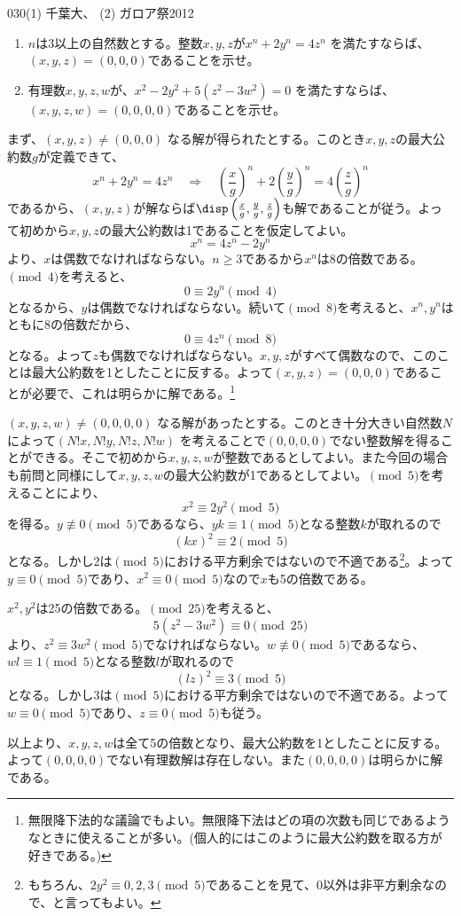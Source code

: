 \begin{thm}{030}{}{(1) 千葉大、 (2) ガロア祭2012}
 \begin{enumerate}
  \item $n$は3以上の自然数とする。整数$x,y,z$が$x^n+2y^n=4z^n$ を満たすならば、$(x,y,z)=(0,0,0)$であることを示せ。
  \item 有理数$x,y,z,w$が、$x^2-2y^2+5(z^2-3w^2)=0$ を満たすならば、$(x,y,z,w)=(0,0,0,0)$であることを示せ。
 \end{enumerate}
\end{thm}

まず、$(x, y, z)\neq (0,0,0)$ なる解が得られたとする。このとき$x,y,z$の最大公約数$g$が定義できて、
\[ x^n+2y^n=4z^n \quad\Rightarrow\quad \left(\frac{x}{g}\right)^n+2\left(\frac{y}{g}\right)^n=4\left(\frac{z}{g}\right)^n \]
であるから、$(x,y,z)$が解ならば$\disp\left(\frac{x}{g},\frac{y}{g},\frac{z}{g}\right)$も解であることが従う。よって初めから$x,y,z$の最大公約数は1であることを仮定してよい。
\[ x^n=4z^n-2y^n \]
より、$x$は偶数でなければならない。$n\ge 3$であるから$x^n$は8の倍数である。$\pmod{4}$を考えると、
\[ 0\equiv 2y^n \pmod{4} \]
となるから、$y$は偶数でなければならない。続いて$\pmod{8}$を考えると、$x^n, y^n$はともに8の倍数だから、
\[ 0\equiv 4z^n \pmod{8} \]
となる。よって$z$も偶数でなければならない。$x,y,z$がすべて偶数なので、このことは最大公約数を1としたことに反する。よって$(x,y,z)=(0,0,0)$であることが必要で、これは明らかに解である。\footnote{無限降下法的な議論でもよい。無限降下法はどの項の次数も同じであるようなときに使えることが多い。(個人的にはこのように最大公約数を取る方が好きである。)}

$(x,y,z,w)\neq(0,0,0,0)$ なる解があったとする。このとき十分大きい自然数$N$によって$(N!x,N!y,N!z,N!w)$ を考えることで$(0,0,0,0)$でない整数解を得ることができる。そこで初めから$x,y,z,w$が整数であるとしてよい。また今回の場合も前問と同様にして$x,y,z,w$の最大公約数が1であるとしてよい。$\pmod{5}$を考えることにより、
\[ x^2\equiv 2y^2 \pmod{5} \]
を得る。$y\not\equiv 0 \pmod{5}$であるなら、$yk\equiv 1 \pmod{5}$となる整数$k$が取れるので
\[ (kx)^2\equiv 2 \pmod{5} \]
となる。しかし2は$\pmod{5}$における平方剰余ではないので不適である\footnote{もちろん、$2y^2\equiv 0,2,3 \pmod{5}$であることを見て、0以外は非平方剰余なので、と言ってもよい。}。よって$y\equiv 0\pmod{5}$であり、$x^2\equiv 0\pmod{5}$なので$x$も5の倍数である。

$x^2,y^2$は25の倍数である。$\pmod{25}$を考えると、
\[ 5(z^2-3w^2) \equiv 0 \pmod{25} \]
より、$z^2\equiv 3w^2 \pmod{5}$でなければならない。$w\not\equiv 0\pmod{5}$であるなら、$wl\equiv 1 \pmod{5}$となる整数$l$が取れるので
\[ (lz)^2\equiv 3 \pmod{5} \]
となる。しかし3は$\pmod{5}$における平方剰余ではないので不適である。よって$w\equiv 0\pmod{5}$であり、$z\equiv 0\pmod{5}$も従う。

以上より、$x,y,z,w$は全て5の倍数となり、最大公約数を1としたことに反する。よって$(0,0,0,0)$でない有理数解は存在しない。また$(0,0,0,0)$は明らかに解である。